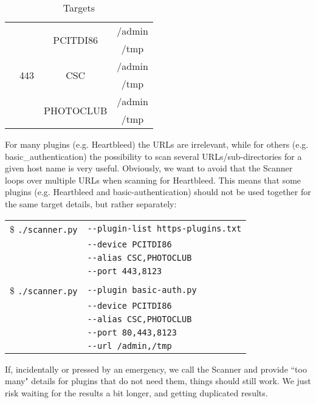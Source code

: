 \begin{table}
\begin{center}
\begin{tabular}{ | c | c | c | c |}
    & \multirow{6}{*}{443} &     \multirow{2}{*}{PCITDI86} & /admin
   \\
    \cline{4-4}
       &     &     & /tmp
    \\
     \cline{3-4}
	& & \multirow{2}{*}{CSC} & /admin
	\\
	 \cline{4-4}
       &     &     & /tmp
    \\
     \cline{3-4}
 	& & \multirow{2}{*}{PHOTOCLUB} & /admin
	\\
	 \cline{4-4}
       &     &     & /tmp

	
        \\ \hline
    \end{tabular}
    \caption{Targets}
    \label{table:targets}
   \end{center}
\end{table}

For many plugins (e.g. Heartbleed) the URLs are irrelevant, while for others (e.g. basic\_authentication) the possibility to scan several URLs/sub-directories for a given host name is very useful. Obviously, we want to avoid that the Scanner loops over multiple URLs when scanning for Heartbleed. This means that some plugins (e.g. Heartbleed and basic-authentication) should not be used together for the same target details, but rather separately: 

\begin{table}[H]
    \begin{tabular}{ c  l }


\$ \texttt{./scanner.py} & \texttt{-{}-plugin-list https-plugins.txt} \\
  & \texttt{-{}-device PCITDI86} \\
  & \texttt{-{}-alias CSC,PHOTOCLUB}\\
  & \texttt{-{}-port 443,8123}\\
  \\
  
    	       \$ \texttt{./scanner.py} & \texttt{-{}-plugin basic-auth.py} \\
  & \texttt{-{}-device PCITDI86} \\
  & \texttt{-{}-alias CSC,PHOTOCLUB}\\
  & \texttt{-{}-port 80,443,8123}\\
    	       & \texttt{-{}-url /admin,/tmp}
    	       
	\end{tabular}
    
\end{table}
\noindent
If, incidentally or pressed by an emergency, we call the Scanner and provide ``too many" details for plugins that do not need them, things should still work. We just risk waiting for the results a bit longer, and getting duplicated results.
